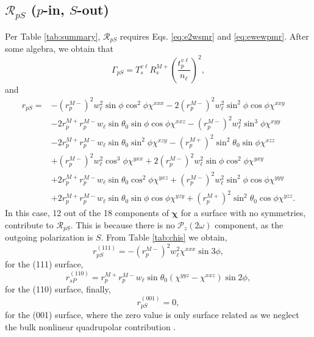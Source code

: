 \subsection{\texorpdfstring{$\mathcal{R}_{pS}$ ($p$-in, $S$-out)}
{RpS (p-in, S-out)}}
\label{sec:RpS}

Per Table \ref{tab:summary}, $\mathcal{R}_{pS}$ requires Eqs. \eqref{eq:e2wsmr}
and \eqref{eq:ewewpmr}. After some algebra, we obtain that
\begin{equation}\label{mcv}
\Gamma_{pS} =
T_{s}^{v\ell}R^{M+}_{s}
\left(\frac{t^{v\ell}_{p}}{n_{\ell}}\right)^{2},
\end{equation}
and
\begin{equation}
\begin{split}
r_{pS}=
&- \left(r^{M-}_{p}\right)^{2}w^{2}_{\ell}\sin\phi\cos^{2}\phi\chi^{xxx}
 - 2\left(r^{M-}_{p}\right)^{2}w^{2}_{\ell}\sin^{2}\phi\cos\phi\chi^{xxy}\\
&- 2r^{M+}_{p}r^{M-}_{p}w_{\ell}\sin\theta_{0}\sin\phi\cos\phi\chi^{xxz}
 - \left(r^{M-}_{p}\right)^{2}w^{2}_{\ell}\sin^{3}\phi\chi^{xyy}\\
&- 2r^{M+}_{p}r^{M-}_{p}w_{\ell}\sin\theta_{0}\sin^{2}\phi\chi^{xzy}
 - \left(r^{M+}_{p}\right)^{2}\sin^{2}\theta_{0}\sin\phi\chi^{xzz}\\
&+ \left(r^{M-}_{p}\right)^{2}w^{2}_{\ell}\cos^{3}\phi\chi^{yxx}
 + 2\left(r^{M-}_{p}\right)^{2}w^{2}_{\ell}\sin\phi\cos^{2}\phi\chi^{yxy}\\
&+ 2r^{M+}_{p}r^{M-}_{p}w_{\ell}\sin\theta_{0}\cos^{2}\phi\chi^{yxz}
 + \left(r^{M-}_{p}\right)^{2}w^{2}_{\ell}\sin^{2}\phi\cos\phi\chi^{yyy}\\
&+ 2r^{M+}_{p}r^{M-}_{p}w_{\ell}\sin\theta_{0}\sin\phi\cos\phi\chi^{yzy}
 + \left(r^{M+}_{p}\right)^{2}\sin^{2}\theta_{0}\cos\phi\chi^{yzz}.
\end{split}
\end{equation}
In this case, 12 out of the 18 components of $\boldsymbol{\chi}$ for a surface
with no symmetries, contribute to $\mathcal{R}_{pS}$. This is because there is
no $\mathcal{P}_{z}(2\omega)$ component, as the outgoing polarization is $S$.
From Table \ref{tab:chis} we obtain,
\begin{equation}\label{eq:rps111}
r^{(111)}_{pS} = - \left(r^{M-}_{p}\right)^{2}w^{2}_{\ell}\chi^{xxx}\sin3\phi,
\end{equation}
for the (111) surface,
\begin{equation}\label{eq:rps110}
r^{(110)}_{sP} =
r^{M+}_{p}r^{M-}_{p}w_{\ell}\sin\theta_{0}(\chi^{yyz} - \chi^{xxz})\sin2\phi,
\end{equation}
for the (110) surface, 
finally,
\begin{equation}\label{eq:rps001}
r^{(001)}_{pS} = 0,
\end{equation}
for the (001) surface, where the zero value is only surface related as we
neglect the bulk nonlinear quadrupolar contribution \cite{sipePRB87}.


